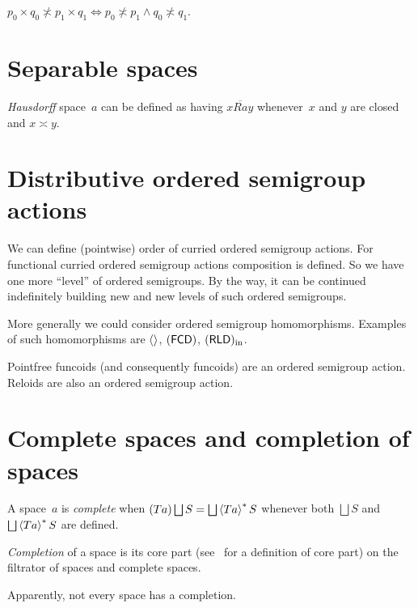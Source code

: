 \begin{thm}
$p_0\times q_0\nasymp p_1\times q_1 \Leftrightarrow p_0\nasymp p_1\land q_0\nasymp q_1$. 
\end{thm}

\chapter{Separable spaces}

\emph{Hausdorff} space~$a$ can be defined as having $x\overline{Ra}y$ whenever~$x$ and $y$ are closed and $x\asymp y$.


\chapter{Distributive ordered semigroup actions}

We can define (pointwise) order of curried ordered semigroup actions. For functional curried ordered semigroup actions composition is defined. So we have one more ``level'' of ordered semigroups. By the way, it can be continued indefinitely building new and new levels of such ordered semigroups.

More generally we could consider ordered semigroup homomorphisms. Examples of such homomorphisms are $\left\langle \right\rangle$, $(\mathsf{FCD})$, $(\mathsf{RLD})_{\mathrm{in}}$.

Pointfree funcoids (and consequently funcoids) are an ordered semigroup action. Reloids are also an ordered semigroup action.

\chapter{Complete spaces and completion of spaces}

A space~$a$ is \emph{complete} when $(Ta)\bigsqcup S=\bigsqcup\rsupfun{Ta}S$ whenever both $\bigsqcup S$ and $\bigsqcup\rsupfun{Ta}S$ are defined.

\begin{defn}
\emph{Completion} of a space is its core part (see~\cite{volume-1} for a definition of core part) on the filtrator of spaces and complete spaces.
\end{defn}

\begin{note}
Apparently, not every space has a completion.
\end{note}

